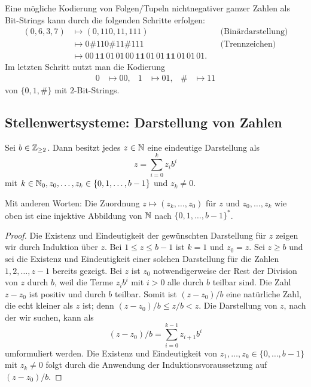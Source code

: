 \begin{bsp}
	Eine mögliche Kodierung von Folgen/Tupeln nichtnegativer ganzer Zahlen als Bit-Strings kann durch die folgenden Schritte erfolgen: 
	\begin{align*}
		(0, 6,3,7) & \mapsto (0,110,11,111)  & & \text{(Binärdarstellung)} 
		\\ & \mapsto 0 \mathbf{\#} 110 \mathbf{\#} 11 \mathbf{\#} 111 & & \text{(Trennzeichen)} 		
		\\ & \mapsto  00 \, \mathbf{11} \,  01 \,  01 \, 00 \, \mathbf{11 }\, 01 \, 01 \, \mathbf{11} \, 01 \, 01 \, 01.
	\end{align*}
	Im letzten Schritt nutzt man die Kodierung 
	\begin{align*}
		0 & \mapsto 00, & 1& \mapsto 01, &  \# & \mapsto 11
	\end{align*}
	von $\{0,1,\#\}$ mit $2$-Bit-Strings. 
\end{bsp} 


\subsection{Stellenwertsysteme: Darstellung von Zahlen}

\begin{thm} \label{thm:stellenwert}
	Sei $b \in \mathbb{Z}_{\ge 2}$. Dann besitzt jedes $z \in \mathbb{N}$ eine eindeutige Darstellung als 
	\begin{equation}\label{z:zur:Basis:b}
		z = \sum_{i=0}^k z_i b^i
	\end{equation}
	mit $k \in \mathbb{N}_0, z_0,\ldots,z_k \in \{0,1,\ldots,b-1\}$ und $z_k \ne 0$.
	
	 Mit anderen Worten: Die Zuordnung $z \mapsto (z_k,\ldots,z_0)$ für $z$ und $z_0,\ldots,z_k$ wie oben ist eine injektive Abbildung von $\mathbb{N}$ nach $\{0,1,\ldots,b-1\}^\ast$.
\end{thm}
\begin{proof}
 	Die Existenz und Eindeutigkeit der gewünschten Darstellung für $z$ zeigen wir durch Induktion über $z$. Bei $1 \le z \le b-1$ ist $k=1$ und $z_0=z$. Sei $z \geq b$ und sei die Existenz und Eindeutigkeit einer solchen Darstellung für die Zahlen $1,2,\ldots,z-1$ bereits gezeigt. Bei $z$ ist $z_0$ notwendigerweise der Rest der Division von $z$ durch $b$, weil die Terme $z_i b^i$ mit $i>0$ alle durch $b$ teilbar sind. Die Zahl $z-z_0$ ist positiv und durch $b$ teilbar. Somit ist $(z-z_0) / b$ eine natürliche Zahl, die echt kleiner als $z$ ist; denn $(z-z_0)/b \le z / b < z$. Die Darstellung von $z$, nach der wir suchen, kann als 
 	\[
 		(z-z_0)/b = \sum_{i=0}^{k-1} z_{i+1} b^i
 	\]
 	umformuliert werden. Die Existenz und Eindeutigkeit von $z_1,\ldots,z_k \in \{0,\ldots,b-1\}$ mit $z_k \ne 0$ folgt durch die Anwendung der Induktionsvoraussetzung auf $(z-z_0)/b$. 
\end{proof} 

